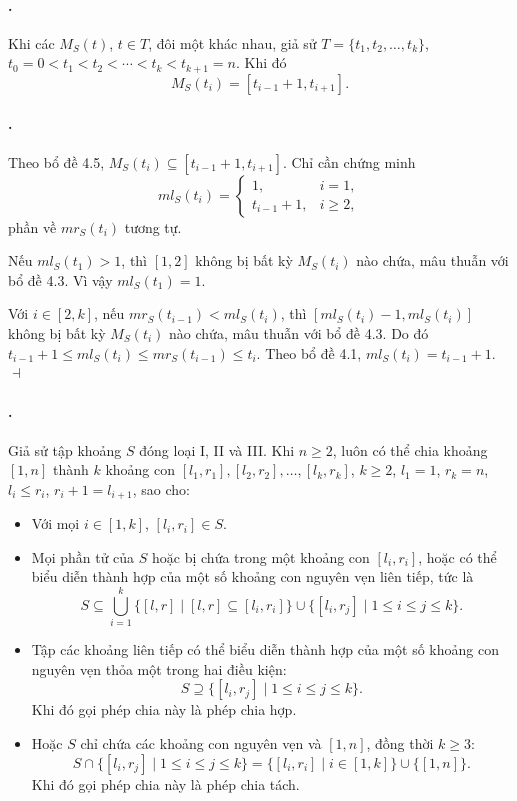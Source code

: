 \documentclass[11pt]{article}
\providecommand{\square}{\dashv}
\begin{document}
\paragraph{.}
Khi các $M_S(t)$, $t\in T$, đôi một khác nhau, giả sử
$T=\{t_1,t_2,\ldots,t_k\}$,
$t_0=0<t_1<t_2<\cdots<t_k<t_{k+1}=n$. Khi đó
\[
  M_S(t_i)=[t_{i-1}+1,t_{i+1}].
\]

\paragraph{.}
Theo bổ đề 4.5, $M_S(t_i)\subseteq[t_{i-1}+1,t_{i+1}]$. Chỉ cần chứng minh
\[
  ml_S(t_i)=
  \begin{cases}
    1, & i=1,\\
    t_{i-1}+1, & i\ge2,
  \end{cases}
\]
phần về $mr_S(t_i)$ tương tự.

Nếu $ml_S(t_1)>1$, thì $[1,2]$ không bị bất kỳ $M_S(t_i)$ nào chứa, mâu thuẫn
với bổ đề 4.3. Vì vậy $ml_S(t_1)=1$.

Với $i\in[2,k]$, nếu $mr_S(t_{i-1})<ml_S(t_i)$, thì
$[ml_S(t_i)-1,ml_S(t_i)]$ không bị bất kỳ $M_S(t_i)$ nào chứa, mâu thuẫn với
bổ đề 4.3. Do đó
$t_{i-1}+1\le ml_S(t_i)\le mr_S(t_{i-1})\le t_i$. Theo bổ đề 4.1,
$ml_S(t_i)=t_{i-1}+1$. \hfill$\square$

\paragraph{.}
Giả sử tập khoảng $S$ đóng loại I, II và III. Khi $n\ge2$, luôn có thể chia
khoảng $[1,n]$ thành $k$ khoảng con
$[l_1,r_1],[l_2,r_2],\ldots,[l_k,r_k]$,
$k\ge2$, $l_1=1$, $r_k=n$, $l_i\le r_i$, $r_i+1=l_{i+1}$, sao cho:
\begin{itemize}
  \item Với mọi $i\in[1,k]$, $[l_i,r_i]\in S$.
  \item Mọi phần tử của $S$ hoặc bị chứa trong một khoảng con $[l_i,r_i]$, hoặc
  có thể biểu diễn thành hợp của một số khoảng con nguyên vẹn liên tiếp, tức là
  \[
    S\subseteq
    \bigcup_{i=1}^k \{[l,r]\mid [l,r]\subseteq[l_i,r_i]\}
    \cup \{[l_i,r_j]\mid 1\le i\le j\le k\}.
  \]
  \item Tập các khoảng liên tiếp có thể biểu diễn thành hợp của một số khoảng
  con nguyên vẹn thỏa một trong hai điều kiện:
  \[
    S\supseteq \{[l_i,r_j]\mid 1\le i\le j\le k\}.
  \]
  Khi đó gọi phép chia này là phép chia hợp.
  \item Hoặc $S$ chỉ chứa các khoảng con nguyên vẹn và $[1,n]$, đồng thời
  $k\ge3$:
  \[
    S\cap\{[l_i,r_j]\mid 1\le i\le j\le k\}
    =\{[l_i,r_i]\mid i\in[1,k]\}\cup\{[1,n]\}.
  \]
  Khi đó gọi phép chia này là phép chia tách.
\end{itemize}
\end{document}
